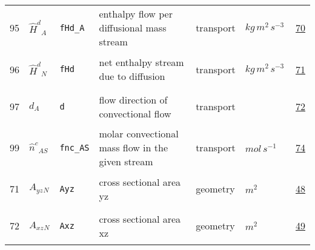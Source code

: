 \begin{longtable}{|p{1cm}|p{2.5cm}|p{4.5cm}|p{8cm}|p{3.0cm}|p{3cm}|p{1cm}|}
                 \\
            95
             & \hypertarget{"v:95"}{ $ {{\hat{H}^d}}{_{A}} $}
             & \verb|fHd_A|
             & enthalpy flow per diffusional mass stream
             & \begin{lay}transport \end{lay}
             & $ kg \,m^{2} \,s^{-3} \, $
             &                 \hyperlink{"e:70"}{ 70 }
                 \\
            96
             & \hypertarget{"v:96"}{ $ {{\hat{H}^d}}{_{N}} $}
             & \verb|fHd|
             & net enthalpy stream due to diffusion
             & \begin{lay}transport \end{lay}
             & $ kg \,m^{2} \,s^{-3} \, $
             &                 \hyperlink{"e:71"}{ 71 }
                 \\
            97
             & \hypertarget{"v:97"}{ $ {d}{_{A}} $}
             & \verb|d|
             & flow direction of convectional flow
             & \begin{lay}transport \end{lay}
             & $  $
             &                 \hyperlink{"e:72"}{ 72 }
                 \\
            99
             & \hypertarget{"v:99"}{ $ {{\hat{n}^c}}{_{{A S}}} $}
             & \verb|fnc_AS|
             & molar convectional mass flow in the given stream
             & \begin{lay}transport \end{lay}
             & $ mol \,s^{-1} \, $
             &                 \hyperlink{"e:74"}{ 74 }
                 \\
            71
             & \hypertarget{"v:71"}{ $ {{A_{yz}}}{_{N}} $}
             & \verb|Ayz|
             & cross sectional area yz
             & \begin{lay}geometry \end{lay}
             & $ m^{2} \, $
             &                 \hyperlink{"e:48"}{ 48 }
                 \\
            72
             & \hypertarget{"v:72"}{ $ {{A_{xz}}}{_{N}} $}
             & \verb|Axz|
             & cross sectional area xz
             & \begin{lay}geometry \end{lay}
             & $ m^{2} \, $
             &                 \hyperlink{"e:49"}{ 49 }
                 \\

\end{longtable}

